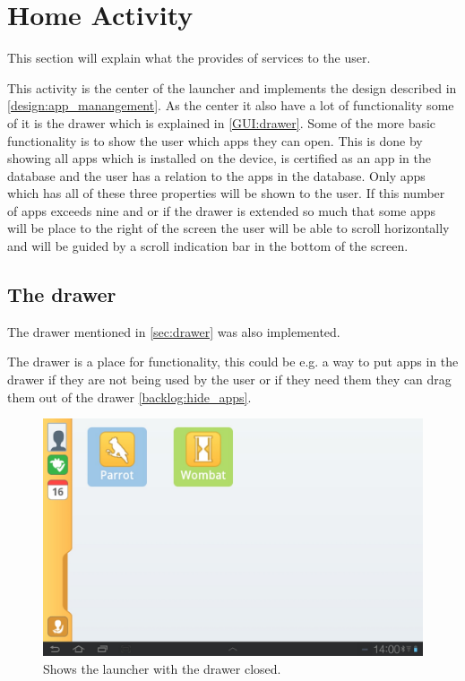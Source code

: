 \section{Home Activity}
This section will explain what the  provides of services to the user.

This activity is the center of the launcher and implements the design described in \autoref{design:app_manangement}. As the center it also have a lot of functionality some of it is the drawer which is explained in \autoref{GUI:drawer}. 
Some of the more basic functionality is to show the user which apps they can open. This is done by showing all apps which is installed on the device, is certified as an app in the database and the user has a relation to the apps in the database. Only apps which has all of these three properties will be shown to the user. If this number of apps exceeds nine and or if the drawer is extended so much that some apps will be place to the right of the screen the user will be able to scroll horizontally and will be guided by a scroll indication bar in the bottom of the screen.

\subsection{The drawer}
The drawer mentioned in \autoref{sec:drawer} was also implemented.

The drawer is a place for functionality, this could be e.g. a way to put apps in the drawer if they are not being used by the user or if they need them they can drag them out of the drawer \autoref{backlog:hide_apps}.

\begin{figure}[h!]
	\centering
	\includegraphics[scale=0.2]{gfx/home-activity_closed}
	\caption{Shows the launcher with the drawer closed.}
	\label{fig:home-activity_closed}
\end{figure}

